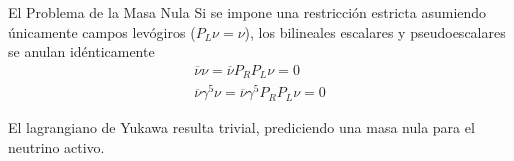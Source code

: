 \begin{alertblock}{El Problema de la Masa Nula}
  Si se impone una restricción estricta asumiendo únicamente campos
  levógiros ($P_L \nu = \nu$), los bilineales escalares y pseudoescalares
  se anulan idénticamente
  \begin{gather}
    \overline{\nu} \nu = \overline{\nu} P_R P_L \nu = 0 \\
    \overline{\nu} \gamma^5 \nu = \overline{\nu} \gamma^5 P_R P_L \nu = 0
  \end{gather}

  El lagrangiano de Yukawa resulta trivial, prediciendo una masa nula para
  el neutrino activo.
\end{alertblock}
